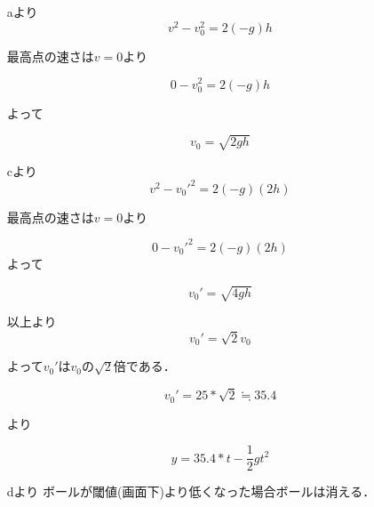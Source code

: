 \begin{itemize}
    \item[aより]
        \begin{equation}
            v^2-v_0^2=2(-g)h
        \end{equation}

        最高点の速さは$v=0$より 

        \begin{equation}
            0-v_0^2=2(-g)h
        \end{equation}

        よって

        \begin{equation}
            v_0=\sqrt{2gh}
        \end{equation}

    \item[cより]
        \begin{equation}
            v^2-v_0'^2=2(-g)(2h)
        \end{equation}

        最高点の速さは$v=0$より 

        \begin{equation}
            0-v_0'^2=2(-g)(2h)
        \end{equation}
        よって

        \begin{equation}
            v_0'=\sqrt{4gh}
        \end{equation}

    \item[以上より]
        \begin{equation}
            v_0'=\sqrt{2}v_0
        \end{equation}

        よって$v_0'$は$v_0$の$\sqrt{2}$倍である． 

        \begin{equation}
            v_0'=25*\sqrt{2} \fallingdotseq 35.4 
        \end{equation}

        より

        \begin{equation}
            y=35.4*t-\frac{1}{2}gt^2
        \end{equation}

    \item[dより] ボールが閾値(画面下)より低くなった場合ボールは消える． 

\end{itemize}

